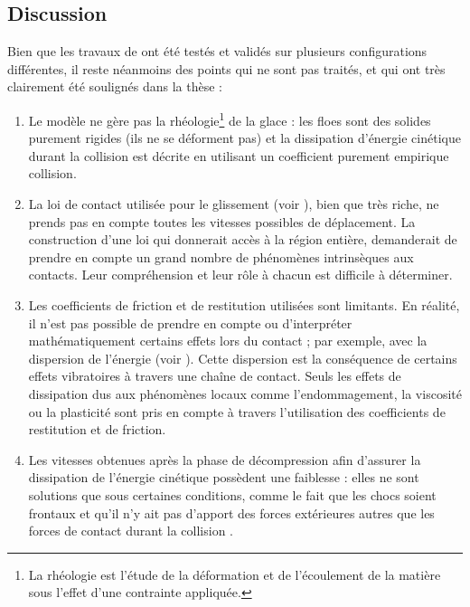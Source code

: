 \subsection{Discussion}
Bien que les travaux de \citeauthor{rabatel2015thesis} ont été testés et validés sur plusieurs configurations différentes, il reste néanmoins des points qui ne sont pas traités, et qui ont très clairement été soulignés dans la thèse \parencite{rabatel2015thesis} :
\begin{enumerate}
    \item Le modèle ne gère pas la rhéologie\footnote{La rhéologie est l'étude de la déformation et de l'écoulement de la matière sous l'effet d'une contrainte appliquée.} de la glace : les floes sont des solides purement rigides (ils ne se déforment pas) et la dissipation d’énergie cinétique durant la collision est décrite en utilisant un coefficient purement empirique collision.  
    \item La loi de contact utilisée pour le glissement (voir \parencite{stewart1996implicit}), bien que très riche, ne prends pas en compte toutes les vitesses possibles de déplacement. La construction d’une loi qui donnerait accès à la région entière, demanderait de prendre en compte un grand nombre de phénomènes intrinsèques aux contacts. Leur compréhension et leur rôle à chacun est difficile à déterminer. 
    \item Les coefficients de friction et de restitution utilisées sont limitants. En réalité, il n’est pas possible de prendre en compte ou d'interpréter mathématiquement certains effets lors du contact ; par exemple, avec la dispersion de l'énergie (voir \parencite{nguyen2014multiple}). Cette dispersion est la conséquence de certains effets vibratoires à travers une chaîne de contact. Seuls les effets de dissipation dus aux phénomènes locaux comme l’endommagement, la viscosité ou la plasticité sont pris en compte à travers l’utilisation des coefficients de restitution et de friction.
    \item Les vitesses obtenues après la phase de décompression afin d'assurer la dissipation de l'énergie cinétique possèdent une faiblesse : elles ne sont solutions que sous certaines conditions, comme le fait que les chocs soient frontaux et qu’il n’y ait pas d’apport des forces extérieures autres que les forces de contact durant la collision \parencite[p.41]{rabatel2015thesis}.
\end{enumerate}



















